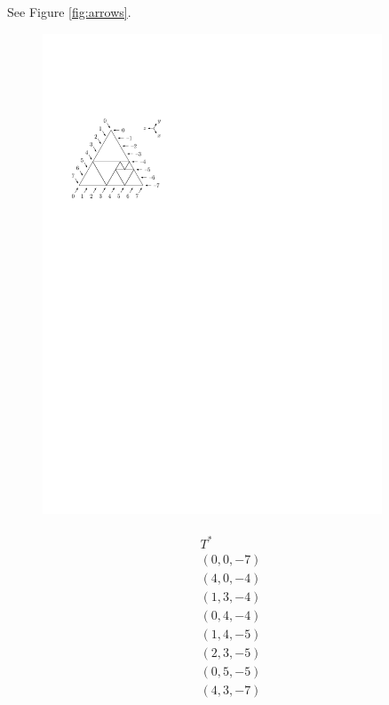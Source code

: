 \begin{exmp} See Figure \ref{fig:arrows}.
\begin{figure}[htb]
	\centering
	\begin{minipage}{.43\linewidth}
		\centering
		\includegraphics[width=0.9\textwidth]{img/arrows.pdf}
	\end{minipage}
	\hspace{.1\linewidth}
	\begin{minipage}{.16\linewidth}
		\begin{align*}
			\begin{array}{c}
				T^* \\ \hline
				(0,0,-7) \\
				(4,0,-4) \\
				(1,3,-4) \\
				(0,4,-4) \\
				(1,4,-5) \\
				(2,3,-5) \\
				(0,5,-5) \\
				(4,3,-7) \\

\end{array}
\end{align*}
\end{minipage}
\end{figure}
\end{exmp}
